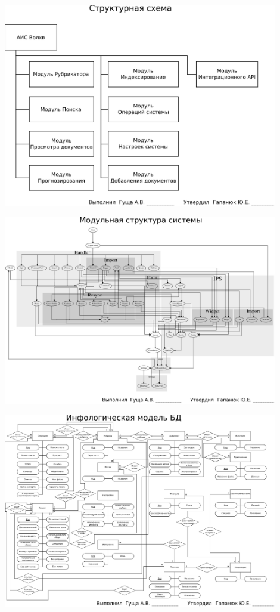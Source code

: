 \documentclass[russian,utf8, a1paper, emptystyle]{eskdgraph}
\begin{document}
\begin{ESKDdrawing}
\includegraphics[width=0.90\textwidth]{lists/list3}
\end{ESKDdrawing}

\begin{ESKDdrawing}
\includegraphics[width=0.90\textwidth]{lists/list4}
\end{ESKDdrawing}

\begin{ESKDdrawing}
\includegraphics[width=0.90\textwidth]{lists/list5}
\end{ESKDdrawing}
\end{document}
